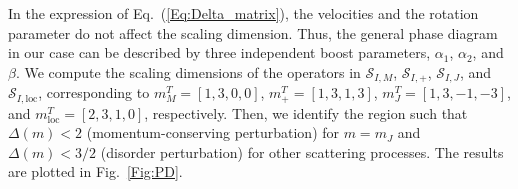 \documentclass[aps,prx,amsmath,superscriptaddress,twocolumn,bibnotes,longbibliography,floatfix]{revtex4-2}
\begin{document}
	In the expression of Eq.~(\ref{Eq:Delta_matrix}), the velocities and the rotation parameter do not affect the scaling dimension. Thus, the general phase diagram in our case can be described by three independent boost parameters, $\alpha_1$, $\alpha_2$, and $\beta$. We compute the scaling dimensions of the operators in $\mathcal{S}_{I,M}$, $\mathcal{S}_{I,+}$, $\mathcal{S}_{I,J}$, and $\mathcal{S}_{I,\text{loc}}$, corresponding to $m_M^T=[1,3,0,0]$, $m_+^T=[1,3,1,3]$, $m^T_J=[1,3,-1,-3]$, and $m^T_{\text{loc}}=[2,3,1,0]$, respectively. Then, we identify the region such that $\Delta(m)<2$ (momentum-conserving perturbation) \cite{GiamarchiT2003,GogolinAO2004} for $m=m_J$ and $\Delta(m)<3/2$ (disorder perturbation) \cite{GiamarchiT1988,GiamarchiT2003} for other scattering processes. The results are plotted in Fig.~\ref{Fig:PD}.
\end{document}
